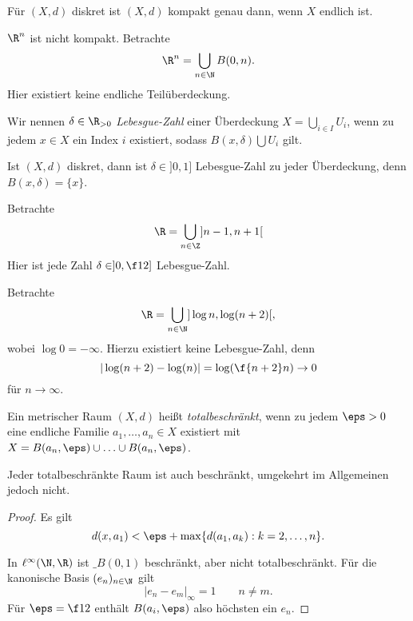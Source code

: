 \begin{df}
\end{df}

\begin{ex}
	Für $(X,d)$ diskret ist $(X,d)$ kompakt genau dann, wenn $X$ endlich ist.

	$\R^n$ ist nicht kompakt.
	Betrachte
	\[
		\R^n = \bigcup_{n\in \N} B(0,n).
	\]
	Hier existiert keine endliche Teilüberdeckung.
\end{ex}

\begin{df}
	Wir nennen $\delta \in \R_{>0}$ \emph{Lebesgue-Zahl} einer Überdeckung $X = \bigcup_{i\in I} U_i$,  wenn zu jedem $x \in X$ ein Index $i$ existiert, sodass $B(x,\delta) \bigcup U_i$ gilt.
\end{df}

\begin{ex}
	Ist $(X,d)$ diskret, dann ist $\delta \in ]0,1]$ Lebesgue-Zahl zu jeder Überdeckung, denn $B(x,\delta) = \{x\}$.

	Betrachte
	\[
		\R = \bigcup_{n \in \Z} ]n-1, n+1[
	\]
	Hier ist jede Zahl $\delta \in ]0,\f 12]$ Lebesgue-Zahl.

	Betrachte
	\[
		\R = \bigcup_{n\in\N} ] \log n, \log(n+2) [,
	\]
	wobei $\log 0 = -\infty$.
	Hierzu existiert keine Lebesgue-Zahl, denn
	\[
		|\log (n+2) - \log(n)| = \log (\f {n+2}n) \to 0
	\]
	für $n \to \infty$.
\end{ex}

\begin{df}
	Ein metrischer Raum $(X,d)$ heißt \emph{totalbeschränkt}, wenn zu jedem $\eps > 0$ eine endliche Familie $a_1, \dotsc, a_n \in X$ existiert mit $X = B(a_n,\eps) \cup \dotsc \cup B(a_n,\eps)$.
\end{df}

\begin{nt}
	Jeder totalbeschränkte Raum ist auch beschränkt, umgekehrt im Allgemeinen jedoch nicht.
	\begin{proof}
		Es gilt
		\[
			d(x,a_1) < \eps + \max \{d(a_1, a_k) : k = 2,\dotsc, n \}.
		\]

		In $\ell^\infty(\N, \R)$ ist $\_B(0,1)$ beschränkt, aber nicht totalbeschränkt.
		Für die kanonische Basis $(e_n)_{n\in \N}$ gilt
		\[
			|e_n - e_m|_\infty = 1
			\qquad n \neq m.
		\]
		Für $\eps = \f 12$ enthält $B(a_i,\eps)$ also höchsten ein $e_n$.
	\end{proof}
\end{nt}


